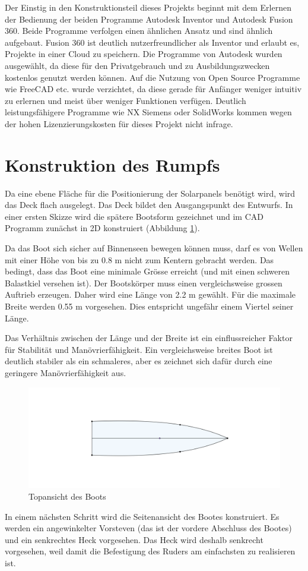 Der Einstig in den Konstruktionsteil dieses Projekts beginnt mit dem Erlernen der Bedienung der beiden Programme Autodesk Inventor und Autodesk Fusion 360. Beide Programme verfolgen einen ähnlichen Ansatz und sind ähnlich aufgebaut. Fusion 360 ist deutlich nutzerfreundlicher als Inventor und erlaubt es, Projekte in einer Cloud zu speichern. Die Programme von Autodesk wurden ausgewählt, da diese für den Privatgebrauch und zu Ausbildungszwecken kostenlos genutzt werden können. Auf die Nutzung von Open Source Programme wie FreeCAD etc. wurde verzichtet, da diese gerade für Anfänger weniger intuitiv zu erlernen und meist über weniger Funktionen verfügen. Deutlich leistungsfähigere Programme wie NX Siemens oder SolidWorks kommen wegen der hohen Lizenzierungskosten für dieses Projekt nicht infrage. 

\section{Konstruktion des Rumpfs}
Da eine ebene Fläche für die Positionierung der Solarpanels benötigt wird, wird das Deck flach ausgelegt. Das Deck bildet den Ausgangspunkt des Entwurfs. In einer ersten Skizze wird die spätere Bootsform  gezeichnet und im CAD Programm zunächst in 2D konstruiert (Abbildung \ref{fig:Decktop}). 

Da das Boot sich sicher auf Binnenseen bewegen können muss, darf es von Wellen mit einer Höhe von bis zu 0.8 m nicht zum Kentern gebracht werden. Das bedingt, dass das Boot eine minimale Grösse erreicht (und mit einen schweren Balastkiel versehen ist). Der Bootskörper muss einen vergleichsweise grossen Auftrieb erzeugen. Daher wird eine Länge von 2.2 m gewählt. Für die maximale Breite werden 0.55 m vorgesehen. Dies entspricht ungefähr einem Viertel seiner Länge. 

Das Verhältnis zwischen der Länge und der Breite ist ein einflussreicher Faktor für Stabilität und Manövrierfähigkeit. Ein vergleichsweise breites Boot ist deutlich stabiler als ein schmaleres, aber es zeichnet sich dafür durch eine geringere Manövrierfähigkeit aus. \cite{Seemannschaft}
\begin{figure}[H]
    \centering
    \includegraphics[width=0.75\linewidth]{assets/boot sketch top.png}
    \caption{Topansicht des Boots}
    \label{fig:Decktop}
   
\end{figure}
In einem nächsten Schritt wird die Seitenansicht des Bootes konstruiert. Es werden ein angewinkelter Vorsteven (das ist der vordere Abschluss des Bootes) und ein senkrechtes Heck vorgesehen. Das Heck wird deshalb senkrecht vorgesehen, weil damit die Befestigung des Ruders am einfachsten zu realisieren ist.

